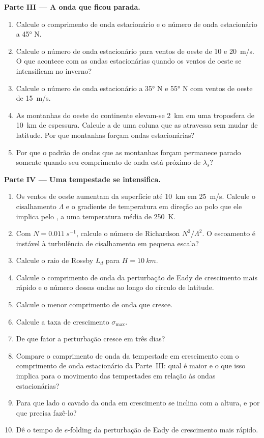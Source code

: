 \begin{problem}
\medskip\noindent\textbf{Parte III --- A onda que ficou parada.}
\begin{enumerate}[resume]
\item Calcule o comprimento de onda estacionário e o número de onda estacionário a
  \ang{45} N.
\item Calcule o número de onda estacionário para ventos de oeste de 10 e
  \qty{20}{m/s}. O que acontece com as ondas estacionárias quando os ventos de oeste
  se intensificam no inverno?
\item Calcule o número de onda estacionário a \ang{35} N e \ang{55} N com
  ventos de oeste de \qty{15}{m/s}.
\item As montanhas do oeste do continente elevam-se \qty{2}{km} em uma
  troposfera de \qty{10}{km} de espessura. Calcule a  de uma coluna
  que as atravessa sem mudar de latitude. Por que montanhas forçam
  ondas estacionárias?
\item Por que o padrão de ondas que as montanhas forçam permanece parado
  somente quando seu comprimento de onda está próximo de $\lambda_s$?
\end{enumerate}

\medskip\noindent\textbf{Parte IV --- Uma tempestade se intensifica.}
\begin{enumerate}[resume]
\item Os ventos de oeste aumentam da superfície até \qty{10}{km} em
  \qty{25}{m/s}. Calcule o cisalhamento $\Lambda$ e o gradiente de temperatura
  em direção ao polo que ele implica pelo , a uma temperatura média de
  \qty{250}{K}.
\item Com $N = \qty{0.011}{s^{-1}}$, calcule o número de Richardson
  $N^2/\Lambda^2$. O escoamento é instável à turbulência de cisalhamento em pequena escala?
\item Calcule o raio de Rossby $L_d$ para $H = \qty{10}{km}$.
\item Calcule o comprimento de onda da perturbação de Eady de crescimento mais rápido e
  o número dessas ondas ao longo do círculo de latitude.
\item Calcule o menor comprimento de onda que cresce.
\item Calcule a taxa de crescimento $\sigma_{\max}$.
\item De que fator a perturbação cresce em três dias?
\item Compare o comprimento de onda da tempestade em crescimento com o
  comprimento de onda estacionário da Parte~III: qual é maior e o que isso implica para o
  movimento das tempestades em relação às ondas estacionárias?
\item Para que lado o cavado da onda em crescimento se inclina com a altura, e
  por que precisa fazê-lo?
\item Dê o tempo de $e$-folding da perturbação de Eady de crescimento mais rápido.
\end{enumerate}
\end{problem}
